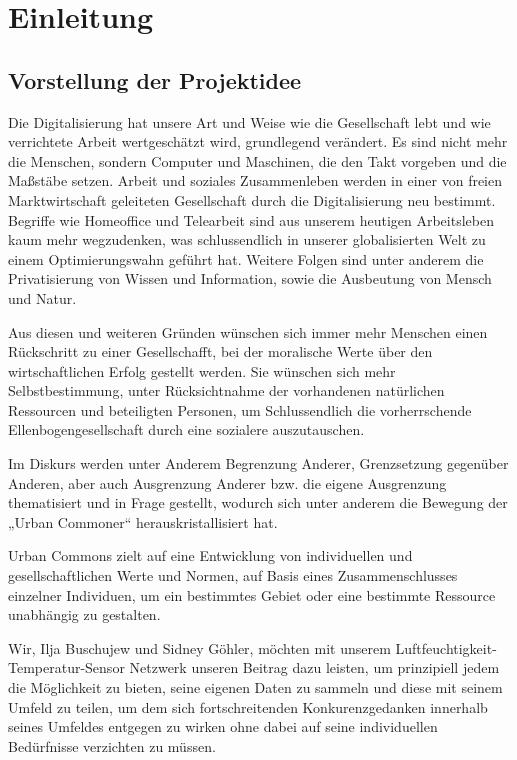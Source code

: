\chapter{Einleitung} \label{Einleitung}

\section{Vorstellung der Projektidee} \label{Vorstellung der Projektidee}

Die Digitalisierung hat unsere Art und Weise wie die Gesellschaft lebt und wie verrichtete Arbeit wertgeschätzt wird, grundlegend verändert. Es sind nicht mehr die Menschen, sondern Computer und Maschinen, die den Takt vorgeben und die Maßstäbe setzen. Arbeit und soziales Zusammenleben werden in einer von freien Marktwirtschaft geleiteten Gesellschaft durch die Digitalisierung neu bestimmt. Begriffe wie Homeoffice und Telearbeit sind aus unserem heutigen Arbeitsleben kaum mehr wegzudenken, was schlussendlich in unserer globalisierten Welt zu einem Optimierungswahn geführt hat. Weitere Folgen sind unter anderem die Privatisierung von Wissen und Information, sowie die Ausbeutung von Mensch und Natur.

Aus diesen und weiteren Gründen wünschen sich immer mehr Menschen einen Rückschritt zu einer Gesellschafft, bei der moralische Werte über den wirtschaftlichen Erfolg gestellt werden.
Sie wünschen sich mehr Selbstbestimmung, unter Rücksichtnahme der vorhandenen natürlichen Ressourcen und beteiligten Personen, um Schlussendlich die vorherrschende Ellenbogengesellschaft durch eine sozialere auszutauschen.

Im Diskurs werden unter Anderem Begrenzung Anderer, Grenzsetzung gegenüber Anderen, aber auch Ausgrenzung Anderer bzw. die eigene Ausgrenzung thematisiert und in Frage gestellt, wodurch sich unter anderem die Bewegung der „Urban Commoner“ herauskristallisiert hat.

Urban Commons zielt auf eine Entwicklung von individuellen und gesellschaftlichen Werte und Normen, auf Basis eines Zusammenschlusses einzelner Individuen, um ein bestimmtes Gebiet oder eine bestimmte Ressource unabhängig zu gestalten.

Wir, Ilja Buschujew und Sidney Göhler, möchten mit unserem Luftfeuchtigkeit-Temperatur-Sensor Netzwerk unseren Beitrag dazu leisten, um prinzipiell jedem die Möglichkeit zu bieten, seine eigenen Daten zu sammeln und diese mit seinem Umfeld zu teilen, um dem sich fortschreitenden Konkurenzgedanken innerhalb seines Umfeldes entgegen zu wirken ohne dabei auf seine individuellen Bedürfnisse verzichten zu müssen.

